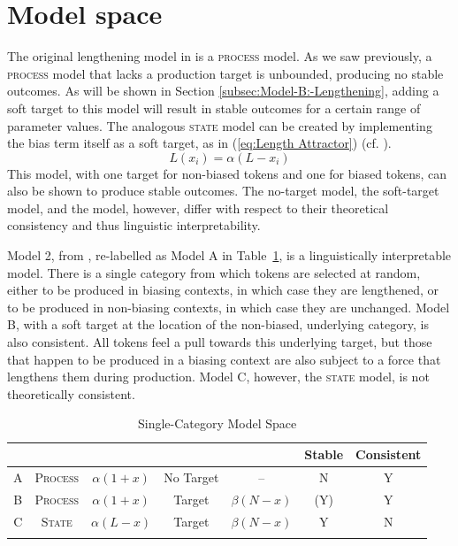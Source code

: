 \section{\label{sec:Model-Interpretation}Model space}

The original lengthening model in 
is a \textsc{process} model. As we saw previously, a \textsc{process}
model that lacks a production target is unbounded, producing no stable
outcomes. As will be shown in Section \ref{subsec:Model-B:-Lengthening},
adding a soft target to this model will result in stable outcomes
for a certain range of parameter values. The analogous \textsc{state}
model can be created by implementing the bias term itself as a soft
target, as in (\ref{eq:Length Attractor}) (cf. \citealt{soskuthy2013phonetic}). 
\begin{equation}
L(x_{i})=\alpha(L-x_{i})\label{eq:Length Attractor}
\end{equation}
This model, with one target for non-biased tokens and one for biased
tokens, can also be shown to produce stable outcomes. The no-target
 model, the soft-target  model, and the
 model, however, differ with respect to their theoretical
consistency and thus linguistic interpretability. 

Model 2, from , re-labelled
as Model A in Table~\ref{tab: Model Comparison-1}, is a linguistically
interpretable model. There is a single category from which tokens
are selected at random, either to be produced in biasing contexts,
in which case they are lengthened, or to be produced in non-biasing
contexts, in which case they are unchanged. Model B, with a soft target
at the location of the non-biased, underlying category, is also consistent.
All tokens feel a pull towards this underlying target, but those that
happen to be produced in a biasing context are also subject to a force
that lengthens them during production. Model C, however, the \textsc{state}
model, is not theoretically consistent. 

\begin{table}[h]\footnotesize
\caption{Single-Category Model Space\label{tab: Model Comparison-1}}
\begin{tabular}{ccccccc}
\lsptoprule
 & \multicolumn{2}{c}{} & \multicolumn{2}{c}{} & Stable & Consistent\tabularnewline
\midrule
A & \textsc{Process} & $\alpha(1+x)$ & No Target & – & N & Y\tabularnewline
B & \textsc{Process} & $\alpha(1+x)$ & Target & $\beta(N-x)$ & (Y) & Y\tabularnewline
C & \textsc{State} & $\alpha(L-x)$ & Target & $\beta(N-x)$ & Y & N\tabularnewline
\lspbottomrule
\end{tabular}
\end{table}

